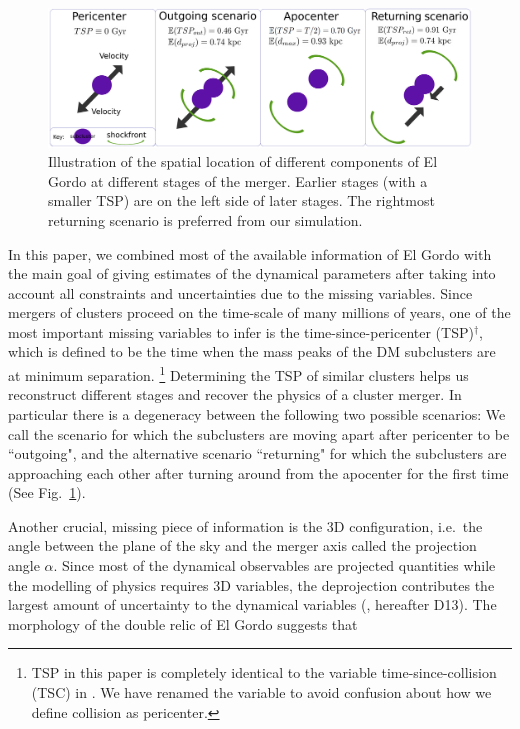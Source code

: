 \documentclass[letterpaper,useAMS,usenatbib]{mn2e}
\begin{document}
\begin{figure}
	\includegraphics[width=\linewidth]{merger_cartoon_white_bg.pdf}
	\caption{Illustration of the spatial location of different components of El Gordo at
		different stages of the merger. Earlier stages (with a smaller TSP) are on the left side of later stages. The rightmost returning scenario is preferred from our simulation.} 
	\label{fig:merger_cartoon}
\end{figure}
In this paper, we combined most of the available information of El Gordo
with the main goal of giving estimates of
the dynamical parameters after taking into account all
constraints and uncertainties due to the missing variables.
Since mergers of clusters proceed on the time-scale of many millions of
years, one of the most important missing variables to infer is the
time-since-pericenter (TSP)$^\dagger$, which is defined to be the time when the mass
peaks of the DM subclusters are at minimum separation. \footnote{TSP in this
	paper is completely identical to the variable time-since-collision (TSC) in
	\cite{Dawson12}. We have renamed the variable to avoid confusion about how we
define collision as pericenter.}
Determining the TSP of similar clusters helps
us reconstruct different stages and recover the physics of a cluster merger.
In particular there is a degeneracy between the following two possible
scenarios:
We call the scenario for which the subclusters are
moving apart after pericenter to be ``outgoing", and the alternative scenario 
``returning" for which the subclusters are approaching each other after turning
around from the apocenter for the first time (See
Fig.~\ref{fig:merger_cartoon}).\par
Another crucial, missing piece of information is the 3D
configuration, i.e.\ the angle between the plane of the sky and the merger
axis called the projection angle $\alpha$. Since most of the dynamical
observables are projected quantities while the modelling of physics
requires 3D
variables, the deprojection contributes the
largest amount of uncertainty to the dynamical variables
(\citealt{D13}, hereafter D13). The morphology of the double relic of El Gordo suggests that
\end{document}
